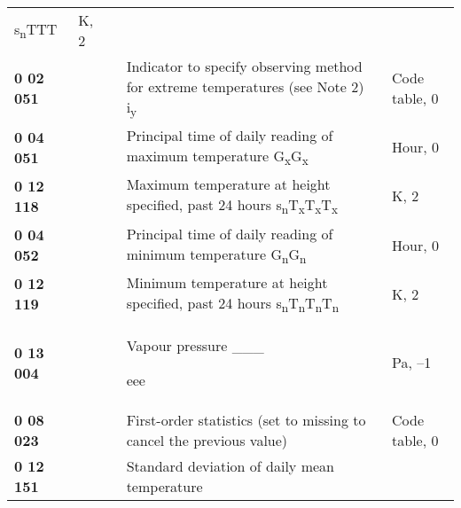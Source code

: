 \begin{longtable}[]{@{}lllll@{}}
\begin{minipage}[t]{0.17\columnwidth}
s\textsubscript{n}TTT\strut
\end{minipage} & \begin{minipage}[t]{0.17\columnwidth}\raggedright
K, 2\strut
\end{minipage}\tabularnewline
\textbf{0 02 051} & & & Indicator to specify observing method for extreme temperatures (see Note 2) i\textsubscript{y} & Code table, 0\tabularnewline
\textbf{0 04 051} & & & Principal time of daily reading of maximum temperature G\textsubscript{x}G\textsubscript{x} & Hour, 0\tabularnewline
\textbf{0 12 118} & & & Maximum temperature at height specified, past 24 hours s\textsubscript{n}T\textsubscript{x}T\textsubscript{x}T\textsubscript{x} & K, 2\tabularnewline
\textbf{0 04 052} & & & Principal time of daily reading of minimum temperature G\textsubscript{n}G\textsubscript{n} & Hour, 0\tabularnewline
\textbf{0 12 119} & & & Minimum temperature at height specified, past 24 hours s\textsubscript{n}T\textsubscript{n}T\textsubscript{n}T\textsubscript{n} & K, 2\tabularnewline
\begin{minipage}[t]{0.17\columnwidth}\raggedright
\textbf{0 13 004}\strut
\end{minipage} & \begin{minipage}[t]{0.17\columnwidth}\raggedright
\strut
\end{minipage} & \begin{minipage}[t]{0.17\columnwidth}\raggedright
\strut
\end{minipage} & \begin{minipage}[t]{0.17\columnwidth}\raggedright
Vapour pressure \_\_\_

eee\strut
\end{minipage} & \begin{minipage}[t]{0.17\columnwidth}\raggedright
Pa, --1\strut
\end{minipage}\tabularnewline
\textbf{0 08 023} & & & First-order statistics (set to missing to cancel the previous value) & Code table, 0\tabularnewline
\begin{minipage}[t]{0.17\columnwidth}\raggedright
\textbf{0 12 151}\strut
\end{minipage} & \begin{minipage}[t]{0.17\columnwidth}\raggedright
\strut
\end{minipage} & \begin{minipage}[t]{0.17\columnwidth}\raggedright
\strut
\end{minipage} & \begin{minipage}[t]{0.17\columnwidth}\raggedright
Standard deviation of daily mean temperature


\end{minipage}
\end{longtable}
